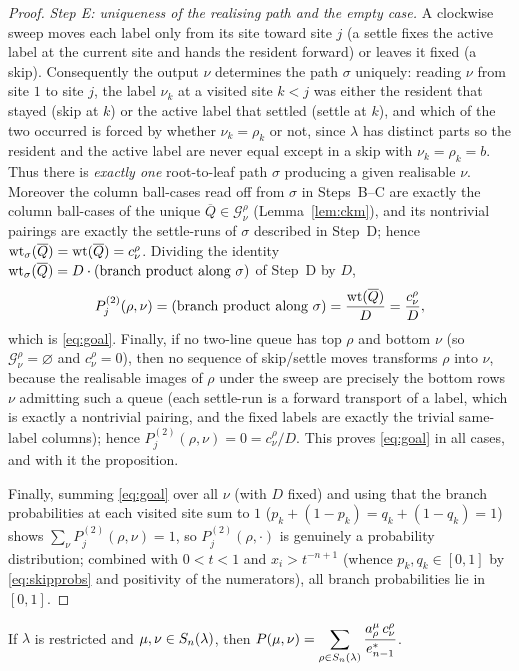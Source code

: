 \begin{proof}
\medskip
\noindent\emph{Step E: uniqueness of the realising path and the empty case.}
A clockwise sweep moves each label only from its site toward site $j$ (a settle
fixes the active label at the current site and hands the resident forward) or
leaves it fixed (a skip). Consequently the output $\nu$ determines the path
$\sigma$ uniquely: reading $\nu$ from site $1$ to site $j$, the label $\nu_k$ at a
visited site $k<j$ was either the resident that stayed (skip at $k$) or the active
label that settled (settle at $k$), and which of the two occurred is forced by
whether $\nu_k=\rho_k$ or not, since $\lambda$ has distinct parts so the resident
and the active label are never equal except in a skip with $\nu_k=\rho_k=b$.
Thus there is \emph{exactly one} root-to-leaf path $\sigma$ producing a given
realisable $\nu$. Moreover the column ball-cases read off from $\sigma$ in
Steps~B--C are exactly the column ball-cases of the unique
$\overline Q\in\mathcal G^\rho_\nu$ (Lemma~\ref{lem:ckm}), and its nontrivial pairings
are exactly the settle-runs of $\sigma$ described in Step~D; hence
$\operatorname{wt}_\sigma(\overline Q)=\operatorname{wt}(\overline Q)=c^\rho_\nu$. Dividing the identity
$\operatorname{wt}_\sigma(\overline Q)=D\cdot(\text{branch product along }\sigma)$ of Step~D
by $D$,
\[
P^{(2)}_j(\rho,\nu)=(\text{branch product along }\sigma)
=\frac{\operatorname{wt}(\overline Q)}{D}=\frac{c^\rho_\nu}{D},
\]
which is \eqref{eq:goal}. Finally, if no two-line queue has top $\rho$ and bottom
$\nu$ (so $\mathcal G^\rho_\nu=\varnothing$ and $c^\rho_\nu=0$), then no sequence of
skip/settle moves transforms $\rho$ into $\nu$, because the realisable images of
$\rho$ under the sweep are precisely the bottom rows $\nu$ admitting such a queue
(each settle-run is a forward transport of a label, which is exactly a nontrivial
pairing, and the fixed labels are exactly the trivial same-label columns); hence
$P^{(2)}_j(\rho,\nu)=0=c^\rho_\nu/D$. This proves \eqref{eq:goal} in all cases,
and with it the proposition.

Finally, summing \eqref{eq:goal} over all $\nu$ (with $D$ fixed) and using that
the branch probabilities at each visited site sum to $1$
($p_k+(1-p_k)=q_k+(1-q_k)=1$) shows $\sum_\nu P^{(2)}_j(\rho,\nu)=1$, so
$P^{(2)}_j(\rho,\cdot)$ is genuinely a probability distribution; combined with
$0<t<1$ and $x_i>t^{-n+1}$ (whence $p_k,q_k\in[0,1]$ by \eqref{eq:skipprobs} and
positivity of the numerators), all branch probabilities lie in $[0,1]$.
\end{proof}

\begin{qthreeproposition}\label{prop:transition}
If $\lambda$ is restricted and $\mu,\nu\in S_n(\lambda)$, then
$\displaystyle P(\mu,\nu)=\sum_{\rho\in S_n(\lambda)}\frac{a^\mu_\rho\,c^\rho_\nu}{e^*_{n-1}}$.
\end{qthreeproposition}

